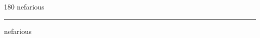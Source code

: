 
\begin{frame}
\begin{center}
\begin{turn}{180}
{\fontsize{2.5cm}{1em}\selectfont nefarious}
\end{turn}
\vspace{1em}\par  
\hrule
\vspace{1em}\par  
{\fontsize{2.5cm}{1em}\selectfont nefarious}
\end{center}
\end{frame}
